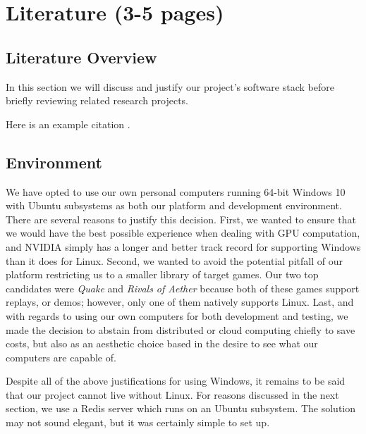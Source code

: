\chapter{Literature (3-5 pages)}
\label{ch:Literature}



\section{Literature Overview}

In this section we will discuss and justify our project's software stack before briefly reviewing related research projects.

Here is an example citation \cite{Doe2017}.




\section{Environment}

We have opted to use our own personal computers running 64-bit Windows 10 with Ubuntu subsystems as both our platform and development environment. There are several reasons to justify this decision. First, we wanted to ensure that we would have the best possible experience when dealing with GPU computation, and NVIDIA simply has a longer and better track record for supporting Windows than it does for Linux. Second, we wanted to avoid the potential pitfall of our platform restricting us to a smaller library of target games. Our two top candidates were {\it Quake} and {\it Rivals of Aether} because both of these games support replays, or demos; however, only one of them natively supports Linux. Last, and with regards to using our own computers for both development and testing, we made the decision to abstain from distributed or cloud computing chiefly to save costs, but also as an aesthetic choice based in the desire to see what our computers are capable of.

Despite all of the above justifications for using Windows, it remains to be said that our project cannot live without Linux. For reasons discussed in the next section, we use a Redis server which runs on an Ubuntu subsystem. The solution may not sound elegant, but it was certainly simple to set up.





